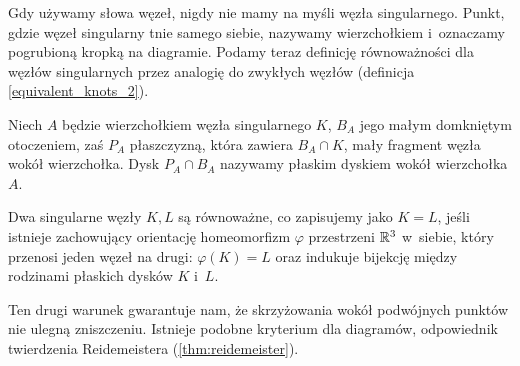 Gdy używamy słowa węzeł, nigdy nie mamy na myśli węzła singularnego.
Punkt, gdzie węzeł singularny tnie samego siebie, nazywamy wierzchołkiem i~oznaczamy pogrubioną kropką na diagramie.
Podamy teraz definicję równoważności dla węzłów singularnych przez analogię do zwykłych węzłów (definicja \ref{equivalent_knots_2}).

\begin{definition}
    Niech $A$ będzie wierzchołkiem węzła singularnego $K$, $B_A$ jego małym domkniętym otoczeniem, zaś $P_A$ płaszczyzną, która zawiera $B_A \cap K$, mały fragment węzła wokół wierzchołka.
    Dysk $P_A \cap B_A$ nazywamy płaskim dyskiem wokół wierzchołka $A$.
\end{definition}

\begin{definition}
    Dwa singularne węzły $K, L$ są równoważne, co zapisujemy jako $K = L$, jeśli istnieje zachowujący orientację homeomorfizm $\varphi$ przestrzeni $\mathbb R^3$ w~siebie, który przenosi jeden węzeł na drugi: $\varphi(K) = L$ oraz indukuje bijekcję między rodzinami płaskich dysków $K$ i~$L$.
\end{definition}

Ten drugi warunek gwarantuje nam, że skrzyżowania wokół podwójnych punktów nie ulegną zniszczeniu.
Istnieje podobne kryterium dla diagramów, odpowiednik twierdzenia Reidemeistera (\ref{thm:reidemeister}).

